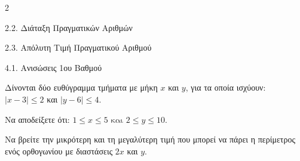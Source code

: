 \begin{ylh}{2}
    \item 2.2. Διάταξη Πραγματικών Αριθμών
    \item 2.3. Απόλυτη Τιμή Πραγματικού Αριθμού
    \item 4.1. Ανισώσεις 1ου Βαθμού
\end{ylh}
Δίνονται δύο ευθύγραμμα τμήματα με μήκη $x$ και $y$, για τα οποία ισχύουν:
$|x - 3| \leq 2$ και $|y - 6| \leq 4.$
\begin{alist}
\item Να αποδείξετε ότι: $1 \leq x \leq 5\text{ και }2 \leq y \leq 10.$
\item Να βρείτε την μικρότερη και τη μεγαλύτερη τιμή που μπορεί να πάρει η περίμετρος ενός ορθογωνίου με διαστάσεις $2x$ και $y.$
\end{alist}

